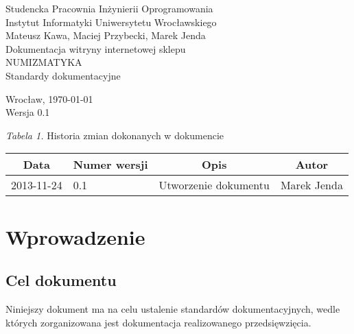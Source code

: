 \documentclass [11pt, a4paper, leqno]	{article}	%
\begin{document}

\begin{center}
	\thispagestyle{empty} 							%
	{\large Studencka Pracownia Inżynierii Oprogramowania} 		\\ [0.5cm]
	{\large Instytut Informatyki Uniwersytetu Wrocławskiego} 	\\ [6.0cm]

	{\large Mateusz Kawa, Maciej Przybecki, Marek Jenda} 		\\ [1.5cm]

	{\huge Dokumentacja witryny internetowej sklepu} 			\\ [0.5cm]
	{\huge NUMIZMATYKA} 										\\ [1.5cm]

	{\large Standardy dokumentacyjne} 							\\ [0.5cm]

	\vfill
	
	{\large Wrocław, \today}									\\ [0.5cm]
	{\large Wersja 0.1}
\end{center}

\newpage


\textit{Tabela 1.} Historia zmian dokonanych w dokumencie

\begin{center}
	\begin{tabular}{| l | l | l | l |}
		\hline
		\multicolumn{1}{|c|}{Data} & 
		\multicolumn{1}{|c|}{Numer wersji} &  
		\multicolumn{1}{|c|}{Opis} &
		\multicolumn{1}{|c|}{Autor} \\ \hline \hline
		2013-11-24 & 0.1 & Utworzenie dokumentu & Marek Jenda \\ \hline
	\end{tabular}
\end{center}

\newpage


\tableofcontents

\newpage

\section{Wprowadzenie}

\subsection{Cel dokumentu}
\noindent
Niniejszy dokument ma na celu ustalenie standardów dokumentacyjnych, wedle których zorganizowana jest dokumentacja realizowanego przedsięwzięcia.
\end{document}
